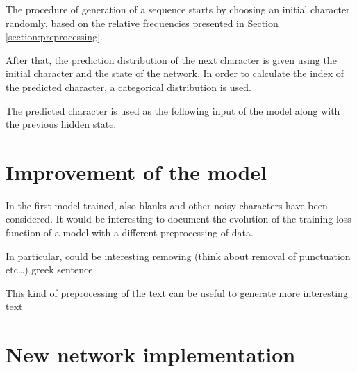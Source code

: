 \documentclass[a4paper,12pt]{article} %
\begin{document}
	The procedure of generation of a sequence starts by choosing an initial 
	character randomly, based on the relative frequencies presented in Section 
	\ref{section:preprocessing}.
	
	After that, the prediction distribution of the next character is given 
	using the initial character and the state of the network. In order to 
	calculate the index of the predicted character, a categorical distribution 
	is used. 
	
	The predicted character is used as the following input of the model along 
	with the previous hidden state.
	
	\section{Improvement of the model}
	In the first model trained, also blanks and other noisy characters have 
	been considered. It would be interesting to document the evolution of the 
	training loss function of a model with a different preprocessing of data.
	
	In particular, could be interesting removing 
	(think about removal of punctuation etc…)
	greek sentence
	
	This kind of preprocessing of the text can be useful to generate more
	interesting text 
	
	
	\section{New network implementation}
	
	
\end{document}

